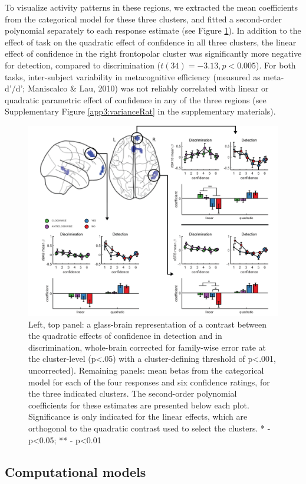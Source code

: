 \documentclass[12pt,twoside]{reedthesis}
\begin{document}
To visualize activity patterns in these regions, we extracted the mean coefficients from the categorical model for these three clusters, and fitted a second-order polynomial separately to each response estimate (see Figure \ref{fig:fMRI-exp1-quadConf}). In addition to the effect of task on the quadratic effect of confidence in all three clusters, the linear effect of confidence in the right frontopolar cluster was significantly more negative for detection, compared to discrimination (\(t(34)=-3.13, p<0.005\)). For both tasks, inter-subject variability in metacognitive efficiency (measured as meta-d'/d'; Maniscalco \& Lau, 2010) was not reliably correlated with linear or quadratic parametric effect of confidence in any of the three regions (see Supplementary Figure \ref{app3:varianceRat} in the supplementary materials).
\begin{figure}
\includegraphics[width=\linewidth]{figure/fMRI/figure5} \caption[Quadratic effect of confidence]{Left, top panel: a glass-brain representation of a contrast between the quadratic effects of confidence in detection and in discrimination, whole-brain corrected for family-wise error rate at the cluster-level (p<.05)  with a cluster-defining threshold of p<.001, uncorrected). Remaining panels: mean betas from the categorical model for each of the four responses and six confidence ratings, for the three indicated clusters. The second-order polynomial coefficients for these estimates are presented below each plot. Significance is only indicated for the linear effects, which are orthogonal to the quadratic contrast used to select the clusters. * - p<0.05; ** - p<0.01}\label{fig:fMRI-exp1-quadConf}
\end{figure}
\hypertarget{computational-models}{%
\subsection{Computational models}\label{computational-models}}
\end{document}

